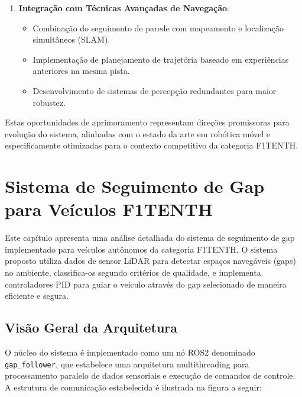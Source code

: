 \begin{enumerate}
    \item \textbf{Integração com Técnicas Avançadas de Navegação}:
          \begin{itemize}
              \item Combinação do seguimento de parede com mapeamento e localização simultâneos
                    (SLAM).
              \item Implementação de planejamento de trajetória baseado em experiências anteriores
                    na mesma pista.
              \item Desenvolvimento de sistemas de percepção redundantes para maior robustez.
          \end{itemize}
\end{enumerate}

Estas oportunidades de aprimoramento representam direções promissoras para
evolução do sistema, alinhadas com o estado da arte em robótica móvel e
especificamente otimizadas para o contexto competitivo da categoria F1TENTH.

\section{Sistema de Seguimento de Gap para Veículos F1TENTH}

Este capítulo apresenta uma análise detalhada do sistema de seguimento de gap
implementado para veículos autônomos da categoria F1TENTH. O sistema proposto
utiliza dados de sensor LiDAR para detectar espaços navegáveis (gaps) no
ambiente, classifica-os segundo critérios de qualidade, e implementa
controladores PID para guiar o veículo através do gap selecionado de maneira
eficiente e segura.

\subsection{Visão Geral da Arquitetura}

O núcleo do sistema é implementado como um nó ROS2 denominado
\texttt{gap\_follower}, que estabelece uma arquitetura multithreading para
processamento paralelo de dados sensoriais e execução de comandos de controle.
A estrutura de comunicação estabelecida é ilustrada na figura a seguir:

